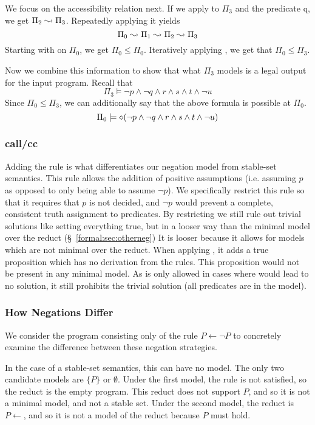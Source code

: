 We focus on the accessibility relation next.
If we apply  to $\Pi_3$ and the predicate q, we get $\Pi_2 \leadsto \Pi_3$.
Repeatedly applying it yields
\[
	\Pi_0 \leadsto \Pi_1 \leadsto \Pi_2 \leadsto \Pi_3
\]
Starting with  on $\Pi_0$, we get $\Pi_0 \leq \Pi_0$.
Iteratively applying , we get that $\Pi_0 \leq \Pi_3$.

Now we combine this information to show that what $\Pi_3$ models is a legal output for the input program.
Recall that
\[
	\Pi_3 \models \neg p \wedge \neg q \wedge r \wedge s \wedge t \wedge \neg u
\]
Since $\Pi_0 \leq \Pi_3$, we can additionally say that the above formula is possible at $\Pi_0$.
\[
	\Pi_0 \models \diamond (\neg p \wedge \neg q \wedge r \wedge s \wedge t \wedge \neg u)
\]

\subsubsection{call/cc}
Adding the  rule is what differentiates our negation model from stable-set semantics.
This rule allows the addition of positive assumptions (i.e. assuming $p$ as opposed to only being able to assume $\neg p$).
We specifically restrict this rule so that it requires that $p$ is not decided, and $\neg p$ would prevent a complete, consistent truth assignment to predicates.
By restricting  we still rule out trivial solutions like setting everything true, but in a looser way than the minimal model over the reduct (\S~\ref{formal:sec:otherneg})
It is looser because it allows for models which are not minimal over the reduct.
When applying , it adds a true proposition which has no derivation from the rules.
This proposition would not be present in any minimal model.
As  is only allowed in cases where  would lead to no solution, it still prohibits the trivial solution (all predicates are in the model).

\subsubsection{How Negations Differ}
We consider the program consisting only of the rule $P \leftarrow \neg P$ to concretely examine the difference between these negation strategies.

In the case of a stable-set semantics, this can have no model.
The only two candidate models are $\{P\}$ or $\emptyset$.
Under the first model, the rule is not satisfied, so the reduct is the empty program.
This reduct does not support $P$, and so it is not a minimal model, and not a stable set.
Under the second model, the reduct is $P \leftarrow$, and so it is not a model of the reduct because $P$ must hold.

